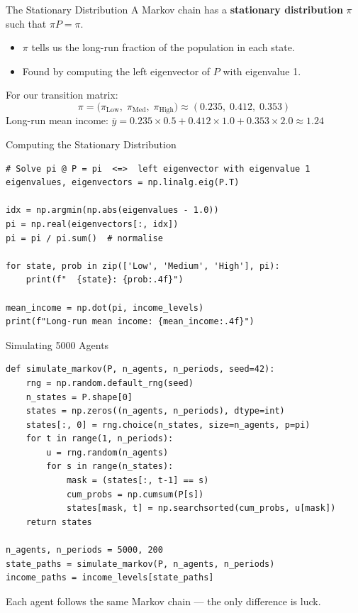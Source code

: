 \documentclass[aspectratio=169, 10pt]{beamer}
\begin{document}
\begin{frame}{The Stationary Distribution}
A Markov chain has a \textbf{stationary distribution} $\pi$ such that
$\pi P = \pi$.
\vspace{0.3em}
\begin{itemize}
  \item $\pi$ tells us the long-run fraction of the population in each state.
  \item Found by computing the left eigenvector of $P$ with eigenvalue 1.
\end{itemize}
\vspace{0.5em}
For our transition matrix:
\[
\pi = \bigl(\pi_{\text{Low}},\; \pi_{\text{Med}},\; \pi_{\text{High}}\bigr)
    \approx (0.235,\; 0.412,\; 0.353)
\]
\vspace{0.3em}
Long-run mean income:
$\bar{y} = 0.235 \times 0.5 + 0.412 \times 1.0 + 0.353 \times 2.0 \approx 1.24$
\end{frame}

\begin{frame}[fragile]{Computing the Stationary Distribution}
\begin{lstlisting}
# Solve pi @ P = pi  <=>  left eigenvector with eigenvalue 1
eigenvalues, eigenvectors = np.linalg.eig(P.T)

idx = np.argmin(np.abs(eigenvalues - 1.0))
pi = np.real(eigenvectors[:, idx])
pi = pi / pi.sum()  # normalise

for state, prob in zip(['Low', 'Medium', 'High'], pi):
    print(f"  {state}: {prob:.4f}")

mean_income = np.dot(pi, income_levels)
print(f"Long-run mean income: {mean_income:.4f}")
\end{lstlisting}
\end{frame}

\begin{frame}[fragile]{Simulating 5000 Agents}
\begin{lstlisting}
def simulate_markov(P, n_agents, n_periods, seed=42):
    rng = np.random.default_rng(seed)
    n_states = P.shape[0]
    states = np.zeros((n_agents, n_periods), dtype=int)
    states[:, 0] = rng.choice(n_states, size=n_agents, p=pi)
    for t in range(1, n_periods):
        u = rng.random(n_agents)
        for s in range(n_states):
            mask = (states[:, t-1] == s)
            cum_probs = np.cumsum(P[s])
            states[mask, t] = np.searchsorted(cum_probs, u[mask])
    return states

n_agents, n_periods = 5000, 200
state_paths = simulate_markov(P, n_agents, n_periods)
income_paths = income_levels[state_paths]
\end{lstlisting}
Each agent follows the same Markov chain --- the only difference is \alert{luck}.
\end{frame}
\end{document}
